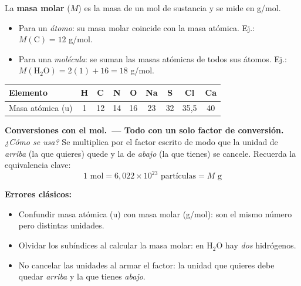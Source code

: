 \documentclass[12pt, letterpaper]{article}
\begin{document}
\begin{cuadroteoria}
  La \textbf{masa molar} ($M$) es la masa de un mol de sustancia y se mide en g/mol.
  \begin{itemize}[leftmargin=*]
    \item Para un \emph{átomo}: su masa molar coincide con la masa atómica. Ej.: $M(\text{C}) = 12$ g/mol.
    \item Para una \emph{molécula}: se suman las masas atómicas de todos sus átomos. Ej.: $M(\text{H}_2\text{O}) = 2(1) + 16 = 18$ g/mol.
  \end{itemize}
\end{cuadroteoria}
\begin{cuadroteoria}
  \begin{center}
    \begin{tabular}{lcccccccc}
      \toprule
      Elemento         & H & C  & N  & O  & Na & S  & Cl     & Ca \\
      \midrule
      Masa atómica (u) & 1 & 12 & 14 & 16 & 23 & 32 & 35{,}5 & 40 \\
      \bottomrule
    \end{tabular}
  \end{center}
\end{cuadroteoria}

\begin{cuadropasos}
  \textbf{Conversiones con el mol.\ --- Todo con un solo factor de conversión.}
  \emph{¿Cómo se usa?} Se multiplica por el factor escrito de modo que la unidad de \emph{arriba} (la que quieres) quede y la de \emph{abajo} (la que tienes) se cancele. Recuerda la equivalencia clave:
  $$\boxed{1 \text{ mol} = 6{,}022 \times 10^{23} \text{ partículas} = M \text{ g}}$$
\end{cuadropasos}

\begin{cuadroadvertencia}
  \textbf{Errores clásicos:}
  \begin{itemize}[leftmargin=*]
    \item Confundir masa atómica (u) con masa molar (g/mol): son el mismo número pero distintas unidades.
    \item Olvidar los subíndices al calcular la masa molar: en $\text{H}_2\text{O}$ hay \emph{dos} hidrógenos.
    \item No cancelar las unidades al armar el factor: la unidad que quieres debe quedar \emph{arriba} y la que tienes \emph{abajo}.
  \end{itemize}
\end{cuadroadvertencia}
\end{document}

